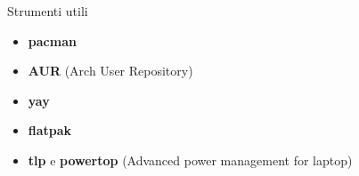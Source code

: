 \begin{frame}{Strumenti utili}
    \begin{itemize}
        \item \textbf{pacman}
        \item \textbf{AUR} (Arch User Repository)
        \item \textbf{yay}
        \item \textbf{flatpak}
        \item \textbf{tlp} e \textbf{powertop} (Advanced power management for laptop)
    \end{itemize}
\end{frame}